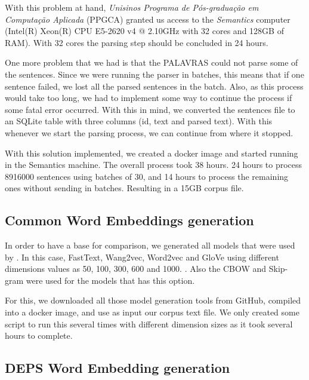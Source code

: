 With this problem at hand, \textit{Unisinos Programa de Pós-graduação em Computação Aplicada} (PPGCA) granted us access to the \textit{Semantics} computer (Intel(R) Xeon(R) CPU E5-2620 v4 @ 2.10GHz with 32 cores and 128GB of RAM). With 32 cores the parsing step should be concluded in 24 hours.

One more problem that we had is that the PALAVRAS could not parse some of the sentences. Since we were running the parser in batches, this means that if one sentence failed, we lost all the parsed sentences in the batch. Also, as this process would take too long, we had to implement some way to continue the process if some fatal error occurred. With this in mind, we converted the sentences file to an SQLite table with three columns (id, text and parsed text). With this whenever we start the parsing process, we can continue from where it stopped.

With this solution implemented, we created a docker image and started running in the Semantics machine. The overall process took 38 hours. 24 hours to process 8916000 sentences using batches of 30, and 14 hours to process the remaining ones without sending in batches. Resulting in a 15GB corpus file.


\subsection{Common Word Embeddings generation}\label{chap:methodsandmaterials:wegeneration}

In order to have a base for comparison, we generated all models that were used by . In this case, FastText, Wang2vec, Word2vec and GloVe using different dimensions values as 50, 100, 300, 600 and 1000. \cite{bojanowski2016enriching, Ling:2015:naacl, Mikolov2013DistributedRO, Pennington2014}. Also the CBOW and Skip-gram were used for the models that has this option.

For this, we downloaded all those model generation tools from GitHub, compiled into a docker image, and use as input our corpus text file. We only created some script to run this several times with different dimension sizes as it took several hours to complete.


\subsection{DEPS Word Embedding generation}\label{chap:methodsandmaterials:depsgeneration}

